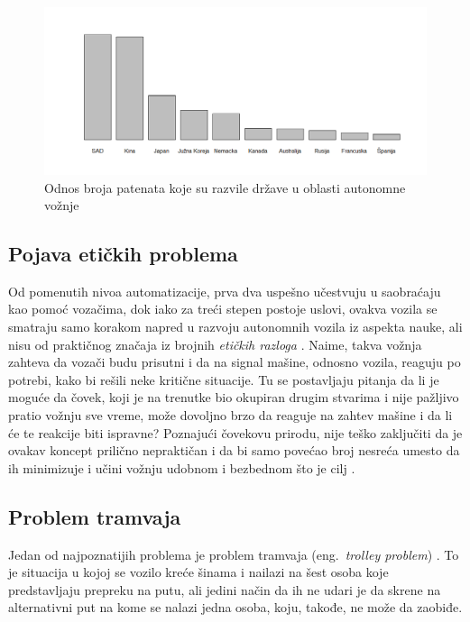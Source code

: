 \documentclass[a4paper]{article}
\begin{document}
\begin{figure}[h!]
\begin{center}
\includegraphics[scale=0.41]{slika.png}
\end{center}
\caption{Odnos broja patenata koje su razvile države u oblasti autonomne vožnje \cite{vehicle_data}} 
\label{fig:histograma}
\end{figure} 

\subsection{Pojava etičkih problema}
\label{subsec:Pojava etičkih problema}
Od pomenutih nivoa automatizacije, prva dva uspešno učestvuju u saobraćaju kao pomoć vozačima, dok iako za treći stepen postoje uslovi, ovakva vozila se smatraju samo korakom napred u razvoju autonomnih vozila iz aspekta nauke, ali nisu od praktičnog značaja iz brojnih \emph{etičkih razloga} \cite{eticki_problemi_vozila}.
Naime, takva vožnja zahteva da vozači budu prisutni i da na signal mašine, odnosno vozila, reaguju po potrebi, kako bi rešili neke kritične situacije. Tu se postavljaju pitanja da li je moguće da čovek, koji je na trenutke bio okupiran drugim stvarima i nije pažljivo pratio vožnju sve vreme, može dovoljno brzo da reaguje na zahtev mašine i da li će te reakcije biti ispravne? Poznajući čovekovu prirodu, nije teško zaključiti da je ovakav koncept prilično nepraktičan i da bi samo povećao broj nesreća umesto da ih minimizuje i učini vožnju udobnom i bezbednom što je cilj \cite{stepen_automonije}.

\subsection{Problem tramvaja}
\label{subsec:Pojava etičkih problema}
Jedan od najpoznatijih problema je problem tramvaja (eng.~{\em trolley problem}) \cite{trolley_problem}. To je situacija u kojoj se vozilo kreće šinama i nailazi na šest osoba koje predstavljaju prepreku na putu, ali jedini način da ih ne udari je da skrene na alternativni put na kome se nalazi jedna osoba, koju, takođe, ne može da zaobiđe.
\end{document}
